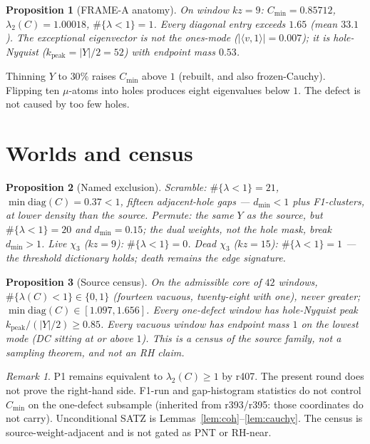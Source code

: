 \documentclass[11pt]{article}
\newtheorem{prop}{Proposition}
\theoremstyle{remark}
\newtheorem{remark}{Remark}
\begin{document}
\begin{prop}[FRAME-A anatomy]\label{prop:anatomy}
On window $kz=9$: $C_{\min}=0.85712$, $\lambda_2(C)=1.00018$,
$\#\{\lambda<1\}=1$.
Every diagonal entry exceeds $1.65$ (mean $33.1$).
The exceptional eigenvector is not the ones-mode
($|\langle v,1\rangle|=0.007$); it is hole-Nyquist
($k_{\mathrm{peak}}=|Y|/2=52$) with endpoint mass $0.53$.
\end{prop}

Thinning $Y$ to $30\%$ raises $C_{\min}$ above $1$
(rebuilt, and also frozen-Cauchy).
Flipping ten $\mu$-atoms into holes produces eight
eigenvalues below $1$.
The defect is not caused by too few holes.

\section{Worlds and census}\label{sec:worlds}

\begin{prop}[Named exclusion]\label{prop:worlds}
Scramble: $\#\{\lambda<1\}=21$, $\min\mathrm{diag}(C)=0.37<1$,
fifteen adjacent-hole gaps --- $d_{\min}<1$ plus F1-clusters,
at \emph{lower} density than the source.
Permute: the same $Y$ as the source, but
$\#\{\lambda<1\}=20$ and $d_{\min}=0.15$; the dual weights,
not the hole mask, break $d_{\min}>1$.
Live $\chi_3$ ($kz=9$): $\#\{\lambda<1\}=0$.
Dead $\chi_3$ ($kz=15$): $\#\{\lambda<1\}=1$ --- the
threshold dictionary holds; death remains the edge
signature.
\end{prop}

\begin{prop}[Source census]\label{prop:census}
On the admissible core of $42$ windows,
$\#\{\lambda(C)<1\}\in\{0,1\}$ (fourteen vacuous, twenty-eight
with one), never greater;
$\min\mathrm{diag}(C)\in[1.097,1.656]$.
Every one-defect window has hole-Nyquist peak
$k_{\mathrm{peak}}/(|Y|/2)\ge 0.85$.
Every vacuous window has endpoint mass $1$ on the lowest
mode (DC sitting at or above $1$).
This is a census of the source family, not a sampling
theorem, and not an RH claim.
\end{prop}

\begin{remark}
P1 remains equivalent to $\lambda_2(C)\ge 1$ by r407.
The present round does not prove the right-hand side.
F1-run and gap-histogram statistics do not control
$C_{\min}$ on the one-defect subsample (inherited from
r393/r395: those coordinates do not carry).
Unconditional SATZ is Lemmas~\ref{lem:coh}--\ref{lem:cauchy}.
The census is source-weight-adjacent and is not gated as
PNT or RH-near.
\end{remark}
\end{document}
